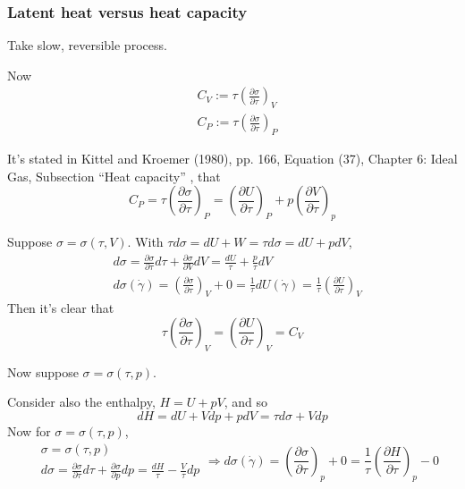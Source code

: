 \documentclass[10pt]{amsart}
\begin{document}
\begin{multicols*}{2}
\subsubsection*{Latent heat versus heat capacity}

Take slow, reversible process.  

Now 
\[
\begin{aligned}
  & C_V := \tau \left( \frac{ \partial \sigma }{ \partial \tau} \right)_V \\ 
  & C_P := \tau \left( \frac{ \partial \sigma }{ \partial \tau } \right)_P
\end{aligned}
\]

It's stated in Kittel and Kroemer (1980), pp. 166, Equation (37), Chapter 6: Ideal Gas, Subsection ``Heat capacity'' \cite{CKittelHKroemer1980}, that 
\begin{equation}
  C_P = \tau \left( \frac{ \partial \sigma }{ \partial \tau} \right)_P = \left( \frac{ \partial U }{ \partial \tau} \right)_P + p \left( \frac{ \partial V}{ \partial \tau} \right)_p
\end{equation}

Suppose $\sigma = \sigma(\tau, V)$.  With $\tau d\sigma = dU + W = \tau d\sigma = dU + pdV$, 
\[
\begin{aligned}
  & d\sigma = \frac{ \partial \sigma }{ \partial \tau } d\tau + \frac{ \partial \sigma }{ \partial V} dV = \frac{dU}{ \tau} + \frac{p}{\tau} dV \\ 
  & d\sigma(\dot{\gamma}) = \left( \frac{ \partial \sigma}{ \partial \tau} \right)_V + 0 = \frac{1}{\tau} dU(\dot{\gamma}) = \frac{1}{\tau} \left( \frac{ \partial U}{ \partial \tau} \right)_V
\end{aligned}
\]
Then it's clear that 
\[
\tau \left( \frac{ \partial \sigma }{ \partial \tau } \right)_V = \left( \frac{ \partial U}{ \partial \tau} \right)_V = C_V
\]

Now suppose $\sigma = \sigma(\tau, p)$.  

Consider also the enthalpy,  $H = U + pV$, and so
\[
dH = dU + Vdp + pdV = \tau d\sigma + Vdp
\]
Now for $\sigma = \sigma(\tau,p)$,
\[
\begin{aligned}
  & \sigma = \sigma(\tau,p) \\ 
  & d\sigma = \frac{ \partial \sigma }{ \partial \tau} d\tau + \frac{ \partial \sigma }{ \partial p } dp = \frac{dH}{\tau} - \frac{V}{\tau} dp
\end{aligned} \Longrightarrow d\sigma(\dot{\gamma}) = \left( \frac{ \partial \sigma }{ \partial \tau} \right)_p + 0 = \frac{1}{\tau} \left( \frac{ \partial H}{ \partial \tau} \right)_p - 0 
\]


\end{multicols*}
\end{document}
